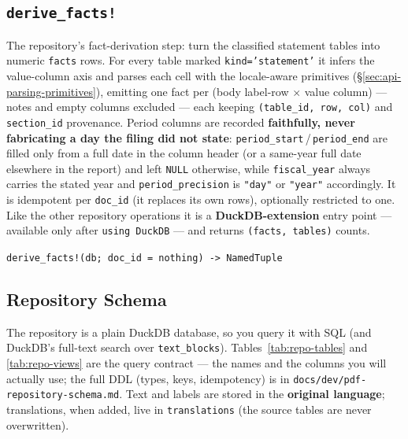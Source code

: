 \documentclass[11pt,a4paper]{report}
\newcommand{\sig}[1]{\medskip\noindent\texttt{#1}\par\medskip}
\begin{document}
\subsection{\texttt{derive\_facts!}}
\label{sec:api-derive-facts}

\noindent The repository's fact-derivation step: turn the classified statement tables into numeric
\texttt{facts} rows. For every table marked \texttt{kind='statement'} it infers the value-column axis and parses
each cell with the locale-aware primitives (\S\ref{sec:api-parsing-primitives}), emitting one fact per (body
label-row $\times$ value column) --- notes and empty columns excluded --- each keeping \texttt{(table\_id, row,
col)} and \texttt{section\_id} provenance. Period columns are recorded \textbf{faithfully, never fabricating a
day the filing did not state}: \texttt{period\_start}\,/\,\texttt{period\_end} are filled only from a full date
in the column header (or a same-year full date elsewhere in the report) and left \texttt{NULL} otherwise, while
\texttt{fiscal\_year} always carries the stated year and \texttt{period\_precision} is \texttt{"day"} or
\texttt{"year"} accordingly. It is idempotent per \texttt{doc\_id} (it replaces its own rows), optionally
restricted to one. Like the other repository operations it is a \textbf{DuckDB-extension} entry point ---
available only after \texttt{using DuckDB} --- and returns \texttt{(facts, tables)} counts.

\sig{derive\_facts!(db; doc\_id = nothing) -> NamedTuple}

\subsection{Repository Schema}
\label{sec:pdf-repo-schema}

The repository is a plain DuckDB database, so you query it with SQL (and DuckDB's full-text search over
\texttt{text\_blocks}). Tables~\ref{tab:repo-tables} and \ref{tab:repo-views} are the query contract --- the
names and the columns you will actually use; the full DDL (types, keys, idempotency) is in
\texttt{docs/dev/pdf-repository-schema.md}. Text and labels are stored in the \textbf{original language};
translations, when added, live in \texttt{translations} (the source tables are never overwritten).
\end{document}
